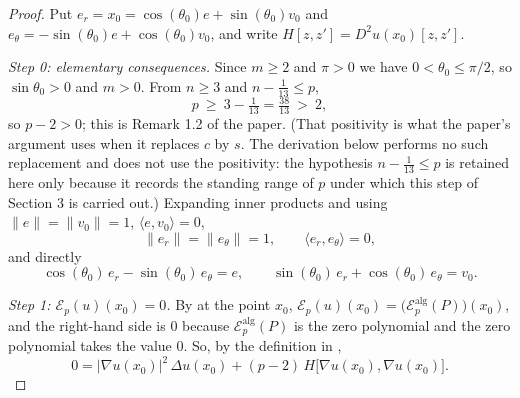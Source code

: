 \begin{proof}
Put $e_r=x_0=\cos(\theta_0)e+\sin(\theta_0)v_0$ and
$e_\theta=-\sin(\theta_0)e+\cos(\theta_0)v_0$, and write $H[z,z']=D^2u(x_0)[z,z']$.

\emph{Step 0: elementary consequences.} Since $m\ge2$ and $\pi>0$ we have
$0<\theta_0\le\pi/2$, so $\sin\theta_0>0$ and $m>0$. From $n\ge3$ and
$n-\tfrac1{13}\le p$,
\begin{equation}\label{eq:pi-p2}
  p\ \ge\ 3-\tfrac1{13}=\tfrac{38}{13}\ >\ 2,
\end{equation}
so $p-2>0$; this is Remark 1.2 of the paper. (That positivity is what the
paper's argument uses when it replaces $c$ by $s$. The derivation below performs
no such replacement and does not use the positivity: the hypothesis
$n-\tfrac1{13}\le p$ is retained here only because it records the standing range
of $p$ under which this step of Section 3 is carried out.) Expanding inner
products and using
$\lVert e\rVert=\lVert v_0\rVert=1$, $\langle e,v_0\rangle=0$,
\begin{equation}\label{eq:pi-frame}
  \lVert e_r\rVert=\lVert e_\theta\rVert=1,
  \qquad\langle e_r,e_\theta\rangle=0,
\end{equation}
and directly
\begin{equation}\label{eq:pi-decomp}
  \cos(\theta_0)\,e_r-\sin(\theta_0)\,e_\theta=e,
  \qquad
  \sin(\theta_0)\,e_r+\cos(\theta_0)\,e_\theta=v_0 .
\end{equation}

\emph{Step 1: $\mathcal{E}_p(u)(x_0)=0$.} By  at the point
$x_0$, $\mathcal{E}_p(u)(x_0)=\bigl(\mathcal{E}^{\mathrm{alg}}_p(P)\bigr)(x_0)$,
and the right-hand side is $0$ because $\mathcal{E}^{\mathrm{alg}}_p(P)$ is the
zero polynomial and the zero polynomial takes the value $0$. So, by the
definition in ,
\begin{equation}\label{eq:pi-eq}
  0=\lvert\nabla u(x_0)\rvert^2\,\Delta u(x_0)
   +(p-2)\,H\bigl[\nabla u(x_0),\nabla u(x_0)\bigr].
\end{equation}


\end{proof}

